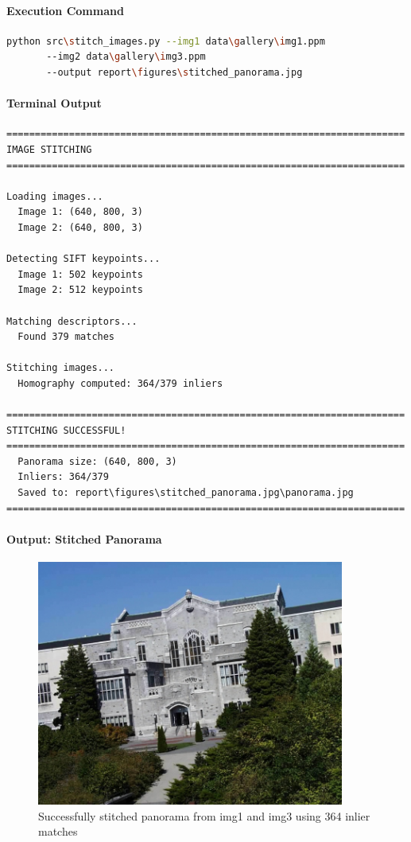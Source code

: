 \documentclass[12pt,a4paper]{article}
\begin{document}
\paragraph{Execution Command}
\begin{lstlisting}[language=bash]
python src\stitch_images.py --img1 data\gallery\img1.ppm 
       --img2 data\gallery\img3.ppm 
       --output report\figures\stitched_panorama.jpg
\end{lstlisting}

\paragraph{Terminal Output}
\begin{lstlisting}
======================================================================
IMAGE STITCHING
======================================================================

Loading images...
  Image 1: (640, 800, 3)
  Image 2: (640, 800, 3)

Detecting SIFT keypoints...
  Image 1: 502 keypoints
  Image 2: 512 keypoints

Matching descriptors...
  Found 379 matches

Stitching images...
  Homography computed: 364/379 inliers

======================================================================
STITCHING SUCCESSFUL!
======================================================================
  Panorama size: (640, 800, 3)
  Inliers: 364/379
  Saved to: report\figures\stitched_panorama.jpg\panorama.jpg
======================================================================
\end{lstlisting}

\paragraph{Output: Stitched Panorama}

\begin{figure}[H]
\centering
\includegraphics[width=0.9\textwidth]{report/figures/stitched_panorama.jpg/panorama.jpg}
\caption{Successfully stitched panorama from img1 and img3 using 364 inlier matches}
\end{figure}
\end{document}
